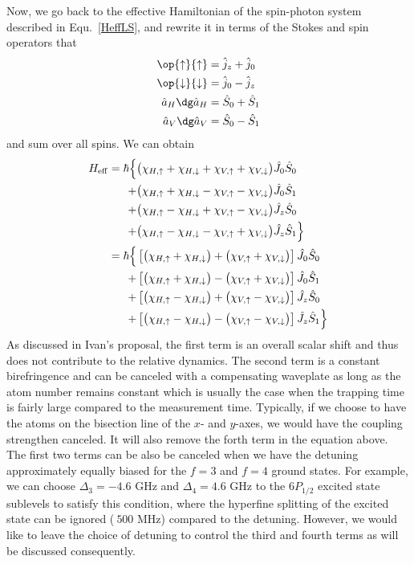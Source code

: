 \documentclass[]{report}
\begin{document}
Now, we go back to the effective Hamiltonian of the spin-photon system described in Equ.~\ref{HeffLS}, and rewrite it in terms of the Stokes and spin operators that 
\begin{align}
\op{\uparrow}{\uparrow} &= \hat{j}_z + \hat{j}_0 \\ \op{\downarrow}{\downarrow} &= \hat{j}_0 - \hat{j}_z\\
\hat{a}_H\dg \hat{a}_H &= \hat{S}_0 + \hat{S}_1\\
\hat{a}_V\dg \hat{a}_V &= \hat{S}_0 - \hat{S}_1
\end{align}
and sum over all spins. We can obtain
\begin{align}
H_{\rm eff} = \hbar \Big\{ & \big( \chi_{H,\uparrow} + \chi_{H,\downarrow} + \chi_{V,\uparrow} + \chi_{V,\downarrow}\big) \hat{J}_0 \hat{S}_0 \nonumber \\
+ & \big( \chi_{H, \uparrow} + \chi_{H,\downarrow} - \chi_{V,\uparrow} - \chi_{V,\downarrow} \big)  \hat{J}_0 \hat{S}_1 \nonumber \\
+ & \big( \chi_{H,\uparrow} - \chi_{H,\downarrow} + \chi_{V,\uparrow} - \chi_{V,\downarrow} \big)  \hat{J}_z \hat{S}_0 \nonumber \\
+ & \big( \chi_{H,\uparrow} - \chi_{H,\downarrow} - \chi_{V,\uparrow} + \chi_{V,\downarrow} \big)  \hat{J}_z \hat{S}_1\Big\}\\
=\hbar \Big\{ & \left[ \big( \chi_{H,\uparrow} + \chi_{H,\downarrow}\big) + \big(\chi_{V,\uparrow} + \chi_{V,\downarrow}\big) \right] \hat{J}_0 \hat{S}_0 \nonumber \\
+ & \left[ \big( \chi_{H, \uparrow} + \chi_{H,\downarrow}\big) - \big( \chi_{V,\uparrow} + \chi_{V,\downarrow} \big)\right]  \hat{J}_0 \hat{S}_1 \nonumber \\
+ & \left[ \big( \chi_{H,\uparrow} - \chi_{H,\downarrow}\big) + \big(\chi_{V,\uparrow} - \chi_{V,\downarrow} \big) \right] \hat{J}_z \hat{S}_0 \nonumber \\
+ & \left[ \big( \chi_{H,\uparrow} - \chi_{H,\downarrow}\big) - \big(\chi_{V,\uparrow} - \chi_{V,\downarrow} \big) \right]  \hat{J}_z \hat{S}_1\Big\}
\end{align}
As discussed in Ivan's proposal, the first term is an overall scalar shift and thus does not contribute to the relative dynamics.  The second term is a constant birefringence and can be canceled with a compensating waveplate as long as the atom number remains constant which is usually the case when the trapping time is fairly large compared to the measurement time. Typically, if we choose to have the atoms on the bisection line of the $ x $- and $ y $-axes, we would have the coupling strengthen canceled. It will also remove the forth term in the equation above. The first two terms can be also be canceled when we have the detuning approximately equally biased for the $ f=3 $ and $ f=4 $ ground states. 
For example, we  can choose $ \Delta_3=-4.6 $ GHz and $ \Delta_4=4.6 $ GHz to the $ 6P_{1/2} $ excited state sublevels to satisfy this condition, where the hyperfine splitting of the excited state can be ignored ($ ~500 $ MHz) compared to the detuning. However, we would like to leave the choice of detuning to control the third and fourth terms as will be discussed consequently. 
\end{document}
